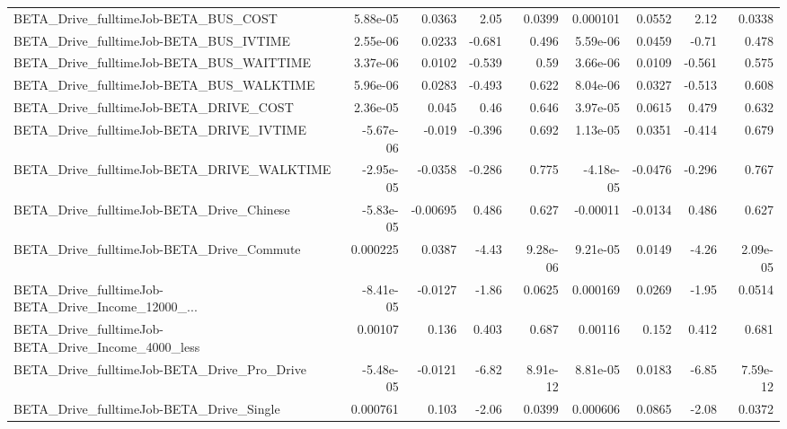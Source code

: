 \begin{tabular}{lrrrrrrrr}
BETA\_Drive\_fulltimeJob-BETA\_BUS\_COST               &    5.88e-05 &       0.0363 &      2.05 &   0.0399 &   0.000101 &      0.0552 &         2.12 &        0.0338 \\
BETA\_Drive\_fulltimeJob-BETA\_BUS\_IVTIME             &    2.55e-06 &       0.0233 &    -0.681 &    0.496 &   5.59e-06 &      0.0459 &        -0.71 &         0.478 \\
BETA\_Drive\_fulltimeJob-BETA\_BUS\_WAITTIME           &    3.37e-06 &       0.0102 &    -0.539 &     0.59 &   3.66e-06 &      0.0109 &       -0.561 &         0.575 \\
BETA\_Drive\_fulltimeJob-BETA\_BUS\_WALKTIME           &    5.96e-06 &       0.0283 &    -0.493 &    0.622 &   8.04e-06 &      0.0327 &       -0.513 &         0.608 \\
BETA\_Drive\_fulltimeJob-BETA\_DRIVE\_COST             &    2.36e-05 &        0.045 &      0.46 &    0.646 &   3.97e-05 &      0.0615 &        0.479 &         0.632 \\
BETA\_Drive\_fulltimeJob-BETA\_DRIVE\_IVTIME           &   -5.67e-06 &       -0.019 &    -0.396 &    0.692 &   1.13e-05 &      0.0351 &       -0.414 &         0.679 \\
BETA\_Drive\_fulltimeJob-BETA\_DRIVE\_WALKTIME         &   -2.95e-05 &      -0.0358 &    -0.286 &    0.775 &  -4.18e-05 &     -0.0476 &       -0.296 &         0.767 \\
BETA\_Drive\_fulltimeJob-BETA\_Drive\_Chinese          &   -5.83e-05 &     -0.00695 &     0.486 &    0.627 &   -0.00011 &     -0.0134 &        0.486 &         0.627 \\
BETA\_Drive\_fulltimeJob-BETA\_Drive\_Commute          &    0.000225 &       0.0387 &     -4.43 & 9.28e-06 &   9.21e-05 &      0.0149 &        -4.26 &      2.09e-05 \\
BETA\_Drive\_fulltimeJob-BETA\_Drive\_Income\_12000\_... &   -8.41e-05 &      -0.0127 &     -1.86 &   0.0625 &   0.000169 &      0.0269 &        -1.95 &        0.0514 \\
BETA\_Drive\_fulltimeJob-BETA\_Drive\_Income\_4000\_less &     0.00107 &        0.136 &     0.403 &    0.687 &    0.00116 &       0.152 &        0.412 &         0.681 \\
BETA\_Drive\_fulltimeJob-BETA\_Drive\_Pro\_Drive        &   -5.48e-05 &      -0.0121 &     -6.82 & 8.91e-12 &   8.81e-05 &      0.0183 &        -6.85 &      7.59e-12 \\
BETA\_Drive\_fulltimeJob-BETA\_Drive\_Single           &    0.000761 &        0.103 &     -2.06 &   0.0399 &   0.000606 &      0.0865 &        -2.08 &        0.0372 \\

\end{tabular}
